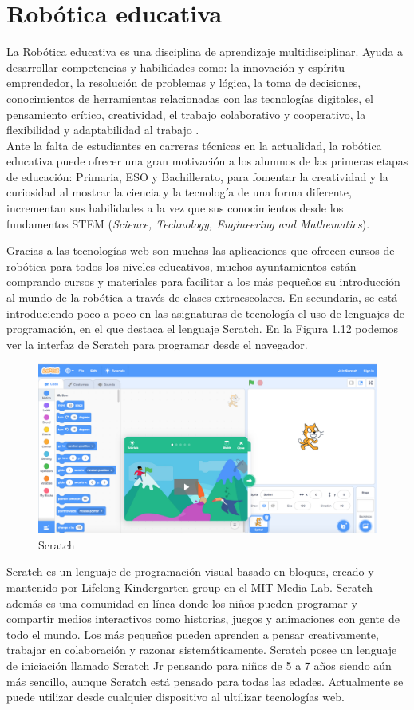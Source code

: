 \newpage
\section{Robótica educativa}

La Robótica educativa es una disciplina de aprendizaje multidisciplinar. Ayuda a desarrollar competencias y habilidades como: la innovación y espíritu emprendedor, la resolución de problemas y lógica, la toma de decisiones, conocimientos de herramientas relacionadas con las tecnologías digitales, el pensamiento crítico, creatividad, el trabajo colaborativo y cooperativo, la flexibilidad y adaptabilidad al trabajo \cite{roboticaedu}.
\\
Ante la falta de estudiantes en carreras técnicas en la actualidad, la robótica educativa puede ofrecer una gran motivación a los alumnos de las primeras etapas de educación: Primaria, ESO y Bachillerato, para fomentar la creatividad y la curiosidad al mostrar la ciencia y la tecnología de una forma diferente, incrementan sus habilidades a la vez que sus conocimientos desde los fundamentos STEM (\textit{Science, Technology, Engineering and Mathematics}).

Gracias a las tecnologías web son muchas las  aplicaciones que ofrecen cursos de robótica para todos los niveles educativos, muchos ayuntamientos están comprando cursos y materiales para facilitar a los más pequeños su introducción al mundo de la robótica a través de clases extraescolares. En secundaria, se está introduciendo poco a poco en las asignaturas de tecnología el uso de lenguajes de programación, en el que destaca el lenguaje Scratch. En la Figura 1.12 podemos ver la interfaz de Scratch para programar desde el navegador.
\begin{figure}[H]
    \centering
    \includegraphics[width=0.6\columnwidth]{chapters/images/scratch.png}
    \caption{Scratch}
    \label{fig:my_label}
\end{figure}

Scratch es un lenguaje de programación visual basado en bloques, creado y  mantenido por Lifelong Kindergarten group en el MIT Media Lab. Scratch además es una comunidad en línea donde los niños pueden programar y compartir medios interactivos como historias, juegos y animaciones con gente de todo el mundo. Los más pequeños pueden aprenden a pensar creativamente, trabajar en colaboración y razonar sistemáticamente\cite{scratch}. Scratch posee un lenguaje de iniciación llamado Scratch Jr pensando para niños de 5 a 7 años siendo aún más sencillo, aunque Scratch está pensado para todas las edades. Actualmente se puede utilizar desde cualquier dispositivo al ultilizar tecnologías web.

